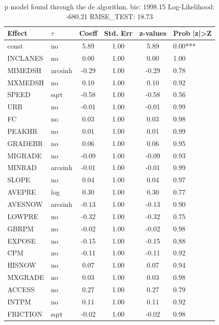 \begin{table}
	\caption{p model found through the de algorithm. bic: 1998.15 Log-Likelihood: -680.21 RMSE_TEST: 18.73}
	\begin{center}
		\begin{tabular}{|l|l|c|c|c|l|}
			\hline
			Effect & $\tau$ & Coeff & Std. Err & z-values & Prob |z|>Z \\
			\hline
			const & no & 5.89 & 1.00 & 5.89 & 0.00*** \\
			\hline
			INCLANES & no & 0.00 & 1.00 & 0.00 & 1.00 \\
			\hline
			MIMEDSH & arcsinh & -0.29 & 1.00 & -0.29 & 0.78 \\
			\hline
			MXMEDSH & no & 0.10 & 1.00 & 0.10 & 0.92 \\
			\hline
			SPEED & sqrt & -0.58 & 1.00 & -0.58 & 0.56 \\
			\hline
			URB & no & -0.01 & 1.00 & -0.01 & 0.99 \\
			\hline
			FC & no & 0.03 & 1.00 & 0.03 & 0.98 \\
			\hline
			PEAKHR & no & 0.01 & 1.00 & 0.01 & 0.99 \\
			\hline
			GRADEBR & no & 0.06 & 1.00 & 0.06 & 0.95 \\
			\hline
			MIGRADE & no & -0.09 & 1.00 & -0.09 & 0.93 \\
			\hline
			MINRAD & arcsinh & -0.01 & 1.00 & -0.01 & 0.99 \\
			\hline
			SLOPE & no & 0.04 & 1.00 & 0.04 & 0.97 \\
			\hline
			AVEPRE & log & 0.30 & 1.00 & 0.30 & 0.77 \\
			\hline
			AVESNOW & arcsinh & -0.13 & 1.00 & -0.13 & 0.90 \\
			\hline
			LOWPRE & no & -0.32 & 1.00 & -0.32 & 0.75 \\
			\hline
			GBRPM & no & -0.02 & 1.00 & -0.02 & 0.98 \\
			\hline
			EXPOSE & no & -0.15 & 1.00 & -0.15 & 0.88 \\
			\hline
			CPM & no & -0.11 & 1.00 & -0.11 & 0.92 \\
			\hline
			HISNOW & no & 0.07 & 1.00 & 0.07 & 0.94 \\
			\hline
			MXGRADE & no & 0.03 & 1.00 & 0.03 & 0.98 \\
			\hline
			ACCESS & no & 0.27 & 1.00 & 0.27 & 0.79 \\
			\hline
			INTPM & no & 0.11 & 1.00 & 0.11 & 0.92 \\
			\hline
			FRICTION & sqrt & -0.02 & 1.00 & -0.02 & 0.98 \\

\end{tabular}
\end{center}
\end{table}
